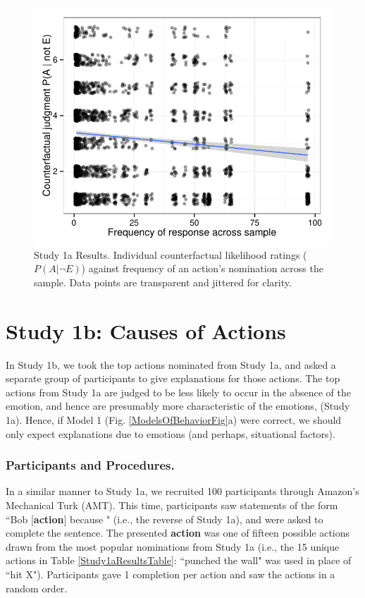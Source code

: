 \documentclass[10pt,letterpaper]{article}
\begin{document}
\begin{figure}[htb!]
\begin{center}
	\includegraphics[width=1\columnwidth]{images/study1a_results.pdf}
\end{center}
\caption{ Study 1a Results. Individual counterfactual likelihood ratings ($P(A | \neg E)$) against frequency of an action's nomination across the sample. Data points are transparent and jittered for clarity. }
\label{Study1aResultsFig}
\end{figure}


\section{Study 1b: Causes of Actions}

	In Study 1b, we took the top actions nominated from Study 1a, and asked a separate group of participants to give explanations for those actions. The top actions from Study 1a are judged to be less likely to occur in the absence of the emotion, and hence are presumably more characteristic of the emotions, (Study 1a). Hence, if Model 1 (Fig. \ref{ModelsOfBehaviorFig}a) were correct, we should only expect explanations due to emotions (and perhaps, situational factors).


\subsubsection{Participants and Procedures.} 
In a similar manner to Study 1a, we recruited 100 participants through Amazon's Mechanical Turk (AMT). This time, participants saw statements of the form ``Bob [\textbf{action}] because \underline{\hspace{3em}}" (i.e., the reverse of Study 1a), and were asked to complete the sentence. The presented \textbf{action} was one of fifteen possible actions drawn from the most popular nominations from Study 1a (i.e., the 15 unique actions in Table \ref{Study1aResultsTable}: ``punched the wall" was used in place of ``hit X"). Participants gave 1 completion per action and saw the actions in a random order.
\end{document}
